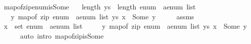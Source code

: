 \begin{isabellebody}
\endisatagproof
{\isafoldproof}%
%
\isadelimproof
%
\endisadelimproof
%
\isadelimdocument
%
\endisadelimdocument
%
\isatagdocument
%
\isamarkuptrue%
%
\endisatagdocument
{\isafolddocument}%
%
\isadelimdocument
%
\endisadelimdocument
{}\isamarkupfalse%
\ map{\isacharunderscore}{\kern0pt}of{\isacharunderscore}{\kern0pt}zip{\isacharunderscore}{\kern0pt}enum{\isacharunderscore}{\kern0pt}is{\isacharunderscore}{\kern0pt}Some{\isacharcolon}{\kern0pt}\isanewline
\ \ \ {\isachardoublequoteopen}length\ ys\ {\isacharequal}{\kern0pt}\ length\ {\isacharparenleft}{\kern0pt}enum\ {\isacharcolon}{\kern0pt}{\isacharcolon}{\kern0pt}\ {\isacharprime}{\kern0pt}a{\isacharcolon}{\kern0pt}{\isacharcolon}{\kern0pt}enum\ list{\isacharparenright}{\kern0pt}{\isachardoublequoteclose}\isanewline
\ \ \ {\isachardoublequoteopen}{\isasymexists}y{\isachardot}{\kern0pt}\ map{\isacharunderscore}{\kern0pt}of\ {\isacharparenleft}{\kern0pt}zip\ {\isacharparenleft}{\kern0pt}enum\ {\isacharcolon}{\kern0pt}{\isacharcolon}{\kern0pt}\ {\isacharprime}{\kern0pt}a{\isacharcolon}{\kern0pt}{\isacharcolon}{\kern0pt}enum\ list{\isacharparenright}{\kern0pt}\ ys{\isacharparenright}{\kern0pt}\ x\ {\isacharequal}{\kern0pt}\ Some\ y{\isachardoublequoteclose}\isanewline
%
\isadelimproof
%
\endisadelimproof
%
\isatagproof
{}\isamarkupfalse%
\ {\isacharminus}{\kern0pt}\isanewline
\ \ \isamarkupfalse%
\ assms\ \isamarkupfalse%
\ {\isachardoublequoteopen}x\ {\isasymin}\ set\ {\isacharparenleft}{\kern0pt}enum\ {\isacharcolon}{\kern0pt}{\isacharcolon}{\kern0pt}\ {\isacharprime}{\kern0pt}a{\isacharcolon}{\kern0pt}{\isacharcolon}{\kern0pt}enum\ list{\isacharparenright}{\kern0pt}\ {\isasymlongleftrightarrow}\isanewline
\ \ \ \ {\isacharparenleft}{\kern0pt}{\isasymexists}y{\isachardot}{\kern0pt}\ map{\isacharunderscore}{\kern0pt}of\ {\isacharparenleft}{\kern0pt}zip\ {\isacharparenleft}{\kern0pt}enum\ {\isacharcolon}{\kern0pt}{\isacharcolon}{\kern0pt}\ {\isacharprime}{\kern0pt}a{\isacharcolon}{\kern0pt}{\isacharcolon}{\kern0pt}enum\ list{\isacharparenright}{\kern0pt}\ ys{\isacharparenright}{\kern0pt}\ x\ {\isacharequal}{\kern0pt}\ Some\ y{\isacharparenright}{\kern0pt}{\isachardoublequoteclose}\isanewline
\ \ \ \ \isamarkupfalse%
\ {\isacharparenleft}{\kern0pt}auto\ intro{\isacharbang}{\kern0pt}{\isacharcolon}{\kern0pt}\ map{\isacharunderscore}{\kern0pt}of{\isacharunderscore}{\kern0pt}zip{\isacharunderscore}{\kern0pt}is{\isacharunderscore}{\kern0pt}Some{\isacharparenright}{\kern0pt}\isanewline

\end{isabellebody}
